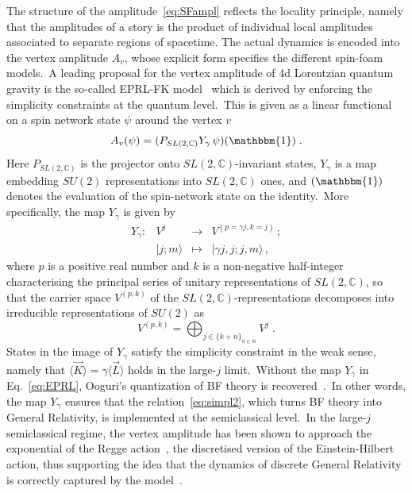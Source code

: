 \documentclass[11pt]{article}
\newcommand{\C}{\mathbb{C}}
\theoremstyle{definition}
\numberwithin{equation}{section}
\begin{document}
The structure of the amplitude~\eqref{eq:SFampl} reflects the locality principle, namely that the amplitudes of a story is the product of individual local amplitudes associated to separate regions of spacetime. The actual dynamics is encoded into the vertex amplitude $A_v$, whose explicit form specifies the different spin-foam models.~A leading proposal for the vertex amplitude of 4d Lorentzian quantum gravity is the so-called EPRL-FK model~\cite{Engle_Livine_Pereira_Rovelli_2008,Freidel_Krasnov_2008} which is derived by enforcing the simplicity constraints at the quantum level.~This is given as a linear functional on a spin network state $\psi$ around the vertex $v$
    \begin{equation}\label{eq:EPRL}
    A_v(\psi)=(P_{SL(2,\C)}Y_\gamma\,\psi)(\mathbbm{1})\;.
    \end{equation}
    Here $P_{SL(2,\C)}$ is the projector onto $SL(2,\C)$-invariant states, $Y_{\gamma}$ is a map embedding $SU(2)$ representations into $SL(2,\mathbb C)$ ones, and $(\mathbbm{1})$ denotes the evaluation of the spin-network state on the identity.~More specifically, the map $Y_{\gamma}$ is given by
    \begin{equation}
    \begin{matrix}
    Y_{\gamma}:&V^j&\to &V^{(p=\gamma j,k=j)}\,;\\
    &| j;m \rangle& \mapsto & |\gamma j,j;j,m \rangle\,,
    \end{matrix}
    \end{equation}
    where $p$ is a positive real number and $k$ is a non-negative half-integer characterising the principal series of unitary representations of $SL(2,\C)$, so that the carrier space $V^{(p,k)}$ of the $SL(2,\mathbb C)$-representations decomposes into irreducible representations of $SU(2)$ as
    \begin{equation}
    V^{(p,k)}=\bigoplus_{j\in\{ k+n\}_{n\in\mathbb{N}}}V^j\;.
    \end{equation}
    States in the image of $Y_{\gamma}$ satisfy the simplicity constraint in the weak sense, namely that $\langle \vec{K}\rangle=\gamma \langle \vec{L}\rangle$ holds in the large-$j$ limit.~Without the map $Y_{\gamma}$ in Eq.~\eqref{eq:EPRL}, Ooguri's quantization of BF theory is recovered~\cite{Ooguri_1992b}.~In other words, the map $Y_{\gamma}$ ensures that the relation~\eqref{eq:simpl2}, which turns BF theory into General Relativity, is implemented at the semiclassical level.~In the large-$j$ semiclassical regime, the vertex amplitude has been shown to approach the exponential of the Regge action~\cite{Regge_1961,Ponzano_Regge_1969}, the discretised version of the Einstein-Hilbert action, thus supporting the idea that the dynamics of discrete General Relativity is correctly captured by the model~\cite{Conrady:2008ea,Bianchi:2010mw,Magliaro:2011dz,Magliaro:2011qm,Han:2011re,Han:2021kll}.
\end{document}

